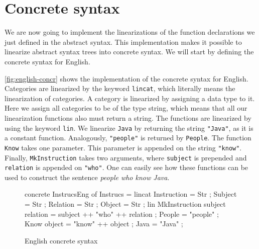 

\section{Concrete syntax}

We are now going to implement the linearizations of the function declarations we just defined in the abstract syntax. This implementation makes it possible to linearize abstract syntax trees into concrete syntax. We will start by defining the concrete syntax for English.


\autoref{fig:english-concr} shows the implementation of the concrete syntax for English. Categories are linearized by the keyword \texttt{lincat}, which literally means the linearization of categories. A category is linearized by assigning a data type to it. Here we assign all categories to be of the type string, which means that all our linearization functions also must return a string. The functions are linearized by using the keyword \texttt{lin}. We linearize \texttt{Java} by returning the string \texttt{"Java"}, as it is a constant function. Analogously, \texttt{"people"} is returned by \texttt{People}. The function \texttt{Know} takes one parameter. This parameter is appended on the string \texttt{"know"}. Finally, \texttt{MkInstruction} takes two arguments, where \texttt{subject} is prepended and \texttt{relation} is appended on \texttt{"who"}. One can easily see how these functions can be used to construct the sentence \emph{people who know Java}.

\newenvironment{myfont}{\myfont}{\par}

\begin{figure}[h]
\begin{code}
concrete InstrucsEng of Instrucs = {
  lincat
    Instruction = Str ;
    Subject = Str ;
    Relation = Str ;
    Object = Str ;
  lin
    MkInstruction subject relation = subject ++ "who" ++ relation ;
    People = "people" ;
    Know object = "know" ++ object ;
    Java = "Java" ;
}
\end{code}
\caption{English concrete syntax\label{fig:english-concr}}
\end{figure}

